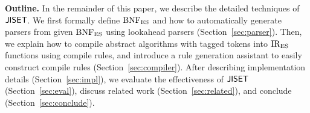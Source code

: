 \smallskip

\textbf{Outline.}
In the remainder of this paper, we describe the detailed techniques of
\( \text{\sf JISET} \).  We first formally define \( \text{BNF}_{\text{ES}} \) and how to
automatically generate parsers from given \( \text{BNF}_{\text{ES}} \) using lookahead
parsers (Section~\ref{sec:parser}).  Then, we explain how to compile
abstract algorithms with tagged tokens into \( \text{IR}_\text{ES} \) functions using
compile rules, and introduce a rule generation assistant to
easily construct compile rules (Section~\ref{sec:compiler}).  After
describing implementation details (Section~\ref{sec:impl}),
we evaluate the effectiveness of \( \text{\sf JISET} \)
(Section~\ref{sec:eval}), discuss related work
(Section~\ref{sec:related}), and conclude (Section~\ref{sec:conclude}).
